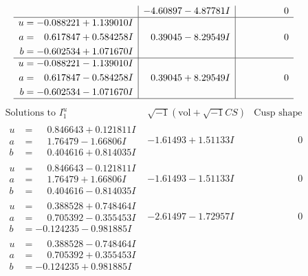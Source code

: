 \documentclass[1p]{elsarticle_modified}
\theoremstyle{definition}
\newcommand{\I}{\sqrt{-1}}
\begin{document}
$$\begin{array}{c|c|c}
 & -4.60897 - 4.87781 I & \phantom{-0.000000 } 0 \\ \hline\begin{aligned}
u &= -0.088221 + 1.139010 I \\
a &= \phantom{-}0.617847 + 0.584258 I \\
b &= -0.602534 + 1.071670 I\end{aligned}
 & \phantom{-}0.39045 - 8.29549 I & \phantom{-0.000000 } 0 \\ \hline\begin{aligned}
u &= -0.088221 - 1.139010 I \\
a &= \phantom{-}0.617847 - 0.584258 I \\
b &= -0.602534 - 1.071670 I\end{aligned}
 & \phantom{-}0.39045 + 8.29549 I & \phantom{-0.000000 } 0\\
 \hline 
 \end{array}$$\newpage$$\begin{array}{c|c|c}  
\text{Solutions to }I^u_{1}& \I (\text{vol} + \sqrt{-1}CS) & \text{Cusp shape}\\
 \hline 
\begin{aligned}
u &= \phantom{-}0.846643 + 0.121811 I \\
a &= \phantom{-}1.76479 - 1.66806 I \\
b &= \phantom{-}0.404616 + 0.814035 I\end{aligned}
 & -1.61493 + 1.51133 I & \phantom{-0.000000 } 0 \\ \hline\begin{aligned}
u &= \phantom{-}0.846643 - 0.121811 I \\
a &= \phantom{-}1.76479 + 1.66806 I \\
b &= \phantom{-}0.404616 - 0.814035 I\end{aligned}
 & -1.61493 - 1.51133 I & \phantom{-0.000000 } 0 \\ \hline\begin{aligned}
u &= \phantom{-}0.388528 + 0.748464 I \\
a &= \phantom{-}0.705392 - 0.355453 I \\
b &= -0.124235 - 0.981885 I\end{aligned}
 & -2.61497 - 1.72957 I & \phantom{-0.000000 } 0 \\ \hline\begin{aligned}
u &= \phantom{-}0.388528 - 0.748464 I \\
a &= \phantom{-}0.705392 + 0.355453 I \\
b &= -0.124235 + 0.981885 I\end{aligned}

\end{array}$$
\end{document}
